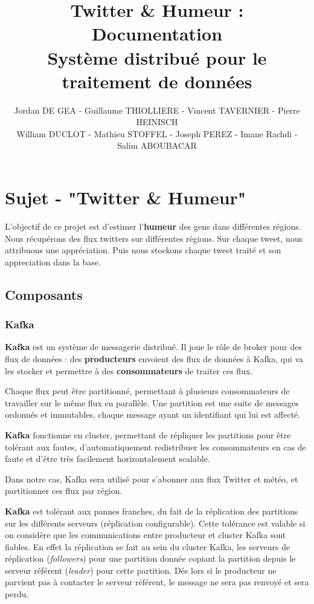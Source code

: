 \documentclass[a4paper,oneside,10pt]{article}
\title{Twitter \& Humeur : Documentation\\
\small{Système distribué pour le traitement de données}
}
\author{Jordan DE GEA - Guillaume THIOLLIERE - Vincent TAVERNIER - Pierre HEINISCH\\
William DUCLOT - Mathieu STOFFEL - Joseph PEREZ - Imane Rachdi - Salim ABOUBACAR}
\begin{document}
\maketitle


\section{Sujet - "Twitter \& Humeur"}

L'objectif de ce projet est d'estimer l'\textbf{humeur} des gens dans différentes régions. Nous récupérons des flux twitters sur différentes régions. Sur chaque tweet, nous attribuons une appréciation. Puis nous stockons chaque tweet traité et son appreciation dans la base. 


\subsection{Composants}

\subsubsection{Kafka}

\textbf{Kafka} est un système de messagerie distribué. Il joue le rôle de 
{broker} pour des flux de données : des \textbf{producteurs} envoient des flux de données à Kafka, qui va les stocker et permettre à des \textbf{consommateurs} de traiter ces flux.

Chaque flux peut être partitionné, permettant à plusieurs consommateurs de travailler sur le même flux en parallèle. Une partition est une suite de messages ordonnés et immutables, chaque message ayant un identifiant qui lui est affecté.

\textbf{Kafka} fonctionne en cluster, permettant de répliquer les partitions pour être tolérant aux fautes, d'automatiquement redistribuer les consommateurs en cas de faute et d'être très facilement horizontalement scalable.

Dans notre cas, Kafka sera utilisé pour s'abonner aux flux Twitter et météo, et partitionner ces flux par région.

\textbf{Kafka} est tolérant aux pannes franches, du fait de la réplication des partitions sur les différents serveurs (réplication configurable). Cette tolérance est valable si on considère que les communications entre producteur et cluster Kafka sont fiables. En effet la réplication se fait au sein du cluster Kafka, les serveurs de réplication (\textit{followers}) pour une partition donnée copiant la partition depuis le serveur référent (\textit{leader}) pour cette partition. Dés lors si le producteur ne parvient pas à contacter le serveur référent, le message ne sera pas renvoyé et sera perdu. 
\end{document}
